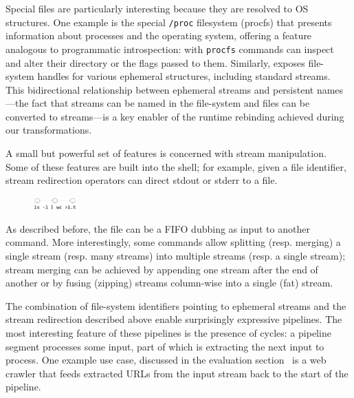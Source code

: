 \documentclass[sigplan,10pt,review,anonymous]{acmart}
\newcommand{\ttt}[1]{\texttt{\small #1}}
\begin{document}
Special files are particularly interesting because they are resolved to OS structures.
One example is the special \ttt{/proc} filesystem (procfs) that presents information about processes and the operating system, offering a feature analogous to programmatic introspection:
  with \ttt{procfs} commands can inspect and alter their directory or the flags passed to them.
Similarly, \unix exposes file-system handles for various ephemeral structures, including standard streams.
This bidirectional relationship between ephemeral streams and persistent names---the fact that streams can be named in the file-system and files can be converted to streams---is a key enabler of the runtime rebinding achieved during our transformations.

A small but powerful set of features is concerned with stream manipulation.
Some of these features are built into the shell;
  for example, given a file identifier, stream redirection operators can direct stdout or stderr to a file.
\begin{figure}
  \vspace{-15pt}
    \includegraphics[width=0.15\textwidth]{./figs/dish_ex3.pdf}
  \vspace{-25pt}
\end{figure}
As described before, the file can be a FIFO dubbing as input to another command.
More interestingly, some commands allow splitting (resp. merging) a single stream (resp. many streams) into multiple streams (resp. a single stream);
  stream merging can be achieved by appending one stream after the end of another or by fusing (zipping) streams column-wise into a single (fat) stream.


The combination of file-system identifiers pointing to ephemeral streams and the stream redirection described above enable surprisingly expressive pipelines. %
The most interesting feature of these pipelines is the presence of cycles:
  a pipeline segment processes some input, part of which is extracting the next input to process.
One example use case, discussed in the evaluation section~ is a web crawler that feeds extracted URLs from the input stream back to the start of the pipeline.
\end{document}
